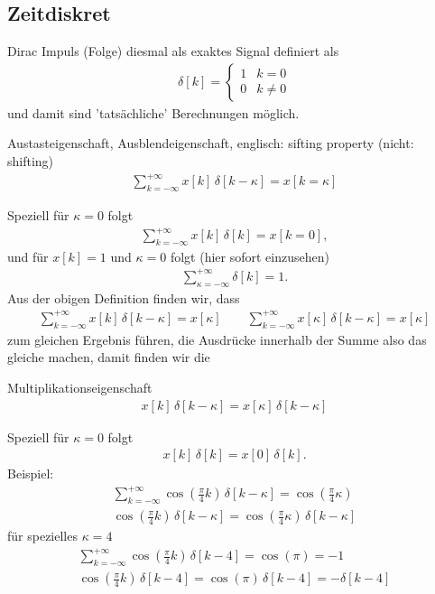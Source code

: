 \subsection{Zeitdiskret}
Dirac Impuls (Folge) diesmal als exaktes Signal definiert als
\begin{align}
\delta[k] =
\begin{cases}
1 & k=0\\
0 & k \neq 0
\end{cases}
\end{align}
und damit sind 'tatsächliche' Berechnungen möglich.
\begin{mdframed}
Austasteigenschaft, Ausblendeigenschaft, englisch: sifting property (nicht: shifting)
\begin{align}
\sum\limits_{k=-\infty}^{+\infty} x[k] \, \delta[k-\kappa] = x[k=\kappa]
\label{eq:AppA_SifitingDT}
\end{align}
\end{mdframed}
Speziell für $\kappa=0$ folgt
\begin{align}
\sum\limits_{k=-\infty}^{+\infty} x[k] \, \delta[k] = x[k=0],
\end{align}
und für $x[k]=1$ und $\kappa=0$ folgt (hier sofort einzusehen)
\begin{align}
\sum\limits_{\kappa=-\infty}^{+\infty} \delta[k] = 1.
\end{align}
Aus der obigen Definition finden wir, dass
\begin{align}
\sum\limits_{k=-\infty}^{+\infty} x[k] \, \delta[k-\kappa] = x[\kappa]\qquad
\sum\limits_{k=-\infty}^{+\infty} x[\kappa] \, \delta[k-\kappa] = x[\kappa]
\end{align}
zum gleichen Ergebnis führen, die Ausdrücke innerhalb der Summe also das gleiche
machen, damit finden wir die
\begin{mdframed}
Multiplikationseigenschaft
\begin{align}
x[k] \, \delta[k-\kappa] = x[\kappa] \, \delta[k-\kappa]
\end{align}
\end{mdframed}
Speziell für $\kappa=0$ folgt
\begin{align}
x[k] \, \delta[k] = x[0] \, \delta[k].
\end{align}
%
Beispiel:
\begin{align}
\sum\limits_{k=-\infty}^{+\infty} \cos(\frac{\pi}{4} k) \, \delta[k-\kappa] =\cos(\frac{\pi}{4} \kappa)\\
\cos(\frac{\pi}{4} k) \, \delta[k-\kappa] = \cos(\frac{\pi}{4} \kappa) \, \delta[k-\kappa]
\end{align}
für spezielles $\kappa=4$
\begin{align}
\sum\limits_{k=-\infty}^{+\infty} \cos(\frac{\pi}{4} k) \, \delta[k-4] =\cos(\pi) = -1\\
\cos(\frac{\pi}{4} k) \, \delta[k-4] = \cos(\pi) \, \delta[k-4] = -\delta[k-4]
\end{align}

